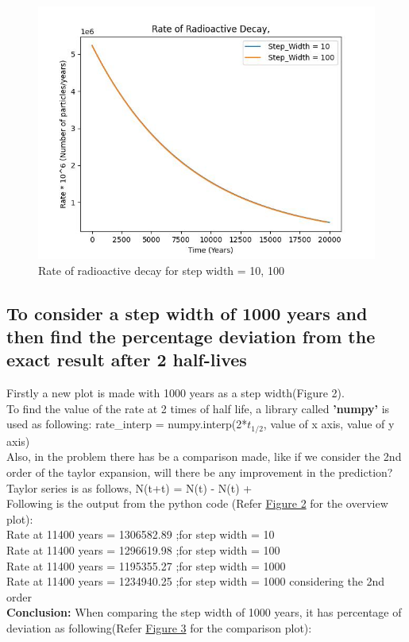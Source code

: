 \documentclass[11pt]{article}
\begin{document}
\begin{figure}[b]
    \centering
    \includegraphics[options]{Carbon_plot_10_100.jpeg}
    \caption{Rate of radioactive decay for step width = 10, 100}
    \label{fig:Rate of radioactive decay for step width = 10, 100}
\end{figure}

\subsection{To consider a step width of 1000 years and then find the percentage deviation from the exact result after 2 half-lives}

Firstly a new plot is made with 1000 years as a step width(Figure 2).\\
To find the value of the rate at 2 times of half life, a library called \textbf{'numpy'} is used as following: rate\_interp = numpy.interp(2*$t_{1/2}$, value of x axis, value of y axis)\\
Also, in the problem there has be a comparison made, like if we consider the 2nd order of the taylor expansion, will there be any improvement in the prediction?\\
Taylor series is as follows,
N(t+\Delta t) = N(t) -  N(t) + \\

Following is the output from the python code (Refer \hyperref[fig:Rate of radioactive decay for step width = 10, 100, 1000]{Figure 2} for the overview plot): \\
Rate at 11400 years = 1306582.89 ;for step width = 10\\
Rate at 11400 years = 1296619.98 ;for step width = 100\\
Rate at 11400 years = 1195355.27 ;for step width = 1000\\
Rate at 11400 years = 1234940.25 ;for step width = 1000 considering the 2nd order\\
\textbf{Conclusion:} When comparing the step width of 1000 years, it has percentage of deviation as following(Refer \hyperref[fig:Rate of radioactive decay for step width = 1000, with 2nd order term]{Figure 3} for the comparison plot):\\
\end{document}
